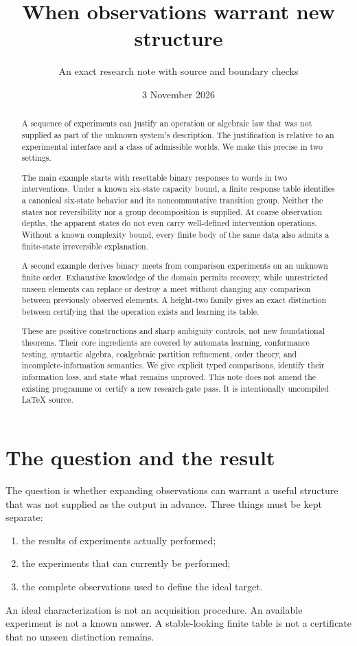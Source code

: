 \documentclass[11pt]{article}
\title{When observations warrant new structure}
\author{An exact research note with source and boundary checks}
\date{3 November 2026}
\theoremstyle{remark}
\begin{document}
\maketitle
\begin{abstract}
A sequence of experiments can justify an operation or algebraic law that was not supplied as part of the unknown system's description. The justification is relative to an experimental interface and a class of admissible worlds. We make this precise in two settings.

The main example starts with resettable binary responses to words in two interventions. Under a known six-state capacity bound, a finite response table identifies a canonical six-state behavior and its noncommutative transition group. Neither the states nor reversibility nor a group decomposition is supplied. At coarse observation depths, the apparent states do not even carry well-defined intervention operations. Without a known complexity bound, every finite body of the same data also admits a finite-state irreversible explanation.

A second example derives binary meets from comparison experiments on an unknown finite order. Exhaustive knowledge of the domain permits recovery, while unrestricted unseen elements can replace or destroy a meet without changing any comparison between previously observed elements. A height-two family gives an exact distinction between certifying that the operation exists and learning its table.

These are positive constructions and sharp ambiguity controls, not new foundational theorems. Their core ingredients are covered by automata learning, conformance testing, syntactic algebra, coalgebraic partition refinement, order theory, and incomplete-information semantics. We give explicit typed comparisons, identify their information loss, and state what remains unproved. This note does not amend the existing programme or certify a new research-gate pass. It is intentionally uncompiled \LaTeX{} source.
\end{abstract}
\tableofcontents

\section{The question and the result}
\label{sec:scope}

The question is whether expanding observations can warrant a useful structure that was not supplied as the output in advance. Three things must be kept separate:
\begin{enumerate}
\item the results of experiments actually performed;
\item the experiments that can currently be performed;
\item the complete observations used to define the ideal target.
\end{enumerate}
An ideal characterization is not an acquisition procedure. An available experiment is not a known answer. A stable-looking finite table is not a certificate that no unseen distinction remains.
\end{document}
